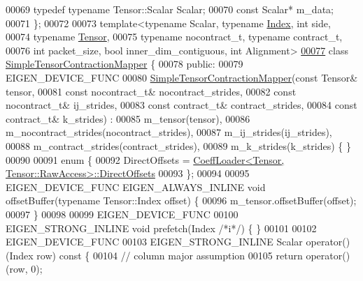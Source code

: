 \begin{DoxyCode}
00069   \textcolor{keyword}{typedef} \textcolor{keyword}{typename} Tensor::Scalar Scalar;
00070   \textcolor{keyword}{const} Scalar* m\_data;
00071 \};
00072 
00073 \textcolor{keyword}{template}<\textcolor{keyword}{typename} Scalar, \textcolor{keyword}{typename} \hyperlink{namespace_eigen_a62e77e0933482dafde8fe197d9a2cfde}{Index}, \textcolor{keywordtype}{int} side,
00074          \textcolor{keyword}{typename} \hyperlink{class_eigen_1_1_tensor}{Tensor},
00075          \textcolor{keyword}{typename} nocontract\_t, \textcolor{keyword}{typename} contract\_t,
00076          \textcolor{keywordtype}{int} packet\_size, \textcolor{keywordtype}{bool} inner\_dim\_contiguous, \textcolor{keywordtype}{int} Alignment>
\hyperlink{class_eigen_1_1internal_1_1_simple_tensor_contraction_mapper}{00077} \textcolor{keyword}{class }\hyperlink{class_eigen_1_1internal_1_1_simple_tensor_contraction_mapper}{SimpleTensorContractionMapper} \{
00078   \textcolor{keyword}{public}:
00079   EIGEN\_DEVICE\_FUNC
00080   \hyperlink{class_eigen_1_1internal_1_1_simple_tensor_contraction_mapper}{SimpleTensorContractionMapper}(\textcolor{keyword}{const} Tensor& tensor,
00081                                 \textcolor{keyword}{const} nocontract\_t& nocontract\_strides,
00082                                 \textcolor{keyword}{const} nocontract\_t& ij\_strides,
00083                                 \textcolor{keyword}{const} contract\_t& contract\_strides,
00084                                 \textcolor{keyword}{const} contract\_t& k\_strides) :
00085       m\_tensor(tensor),
00086       m\_nocontract\_strides(nocontract\_strides),
00087       m\_ij\_strides(ij\_strides),
00088       m\_contract\_strides(contract\_strides),
00089       m\_k\_strides(k\_strides) \{ \}
00090 
00091   \textcolor{keyword}{enum} \{
00092     DirectOffsets = \hyperlink{struct_eigen_1_1internal_1_1_coeff_loader}{CoeffLoader<Tensor, Tensor::RawAccess>::DirectOffsets}
00093   \};
00094 
00095   EIGEN\_DEVICE\_FUNC EIGEN\_ALWAYS\_INLINE \textcolor{keywordtype}{void} offsetBuffer(\textcolor{keyword}{typename} Tensor::Index offset) \{
00096     m\_tensor.offsetBuffer(offset);
00097   \}
00098 
00099   EIGEN\_DEVICE\_FUNC
00100   EIGEN\_STRONG\_INLINE \textcolor{keywordtype}{void} prefetch(Index \textcolor{comment}{/*i*/}) \{ \}
00101 
00102   EIGEN\_DEVICE\_FUNC
00103   EIGEN\_STRONG\_INLINE Scalar operator()(Index row)\textcolor{keyword}{ const }\{
00104     \textcolor{comment}{// column major assumption}
00105     \textcolor{keywordflow}{return} operator()(row, 0);

\end{DoxyCode}
